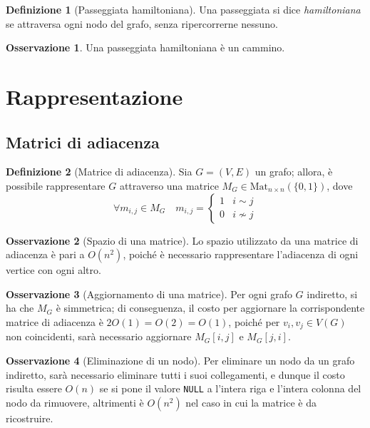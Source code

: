 \documentclass[14pt]{extreport}
\theoremstyle{definition}
\newtheorem{definition}{Definizione}[subsection]
\theoremstyle{definition}
\newtheorem{remark}{Osservazione}[subsection]
\begin{document}
\begin{definition}[Passeggiata hamiltoniana]
    Una passeggiata si dice \textit{hamiltoniana} se attraversa ogni nodo del grafo, senza ripercorrerne nessuno.
\end{definition}

\begin{remark}
    Una passeggiata hamiltoniana è un cammino.
\end{remark}

\section{Rappresentazione}

\subsection{Matrici di adiacenza}

\begin{definition}[Matrice di adiacenza]
    Sia $G = (V, E)$ un grafo; allora, è possibile rappresentare $G$ attraverso una matrice $M_G \in \textrm{Mat}_{n \times n}(\{0, 1\})$, dove $$\forall m_{i, j} \in M_G \quad m_{i, j} = \left \{ \begin{array}{ll} 1 & i \sim j\\ 0 & i \nsim j \end{array} \right.$$
\end{definition}

\begin{remark}[Spazio di una matrice]
    Lo spazio utilizzato da una matrice di adiacenza è pari a $O(n^2)$, poiché è necessario rappresentare l'adiacenza di ogni vertice con ogni altro.
\end{remark}

\begin{remark}[Aggiornamento di una matrice]
    Per ogni grafo $G$ indiretto, si ha che $M_G$ è simmetrica; di conseguenza, il costo per aggiornare la corrispondente matrice di adiacenza è $2 O(1)= O(2) = O(1)$, poiché per $v_i, v_j \in V(G)$ non coincidenti, sarà necessario aggiornare $M_G[i, j]$ e $M_G[j, i]$.
\end{remark}

\begin{remark}[Eliminazione di un nodo]
    Per eliminare un nodo da un grafo indiretto, sarà necessario eliminare tutti i suoi collegamenti, e dunque il costo risulta essere $O(n)$ se si pone il valore \texttt{NULL} a l'intera riga e l'intera colonna del nodo da rimuovere, altrimenti è $O(n^2)$ nel caso in cui la matrice è da ricostruire.
\end{remark}
\end{document}
